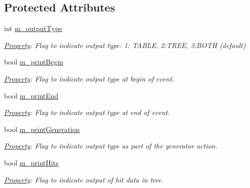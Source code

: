 \subsection*{Protected Attributes}
\begin{DoxyCompactItemize}
\item 
int \hyperlink{class_d_d4hep_1_1_simulation_1_1_geant4_particle_print_a0dc2b81ac74da2e496892d9cccf30f56}{m\+\_\+output\+Type}
\begin{DoxyCompactList}\small\item\em \hyperlink{class_d_d4hep_1_1_property}{Property}\+: Flag to indicate output type\+: 1\+: T\+A\+B\+LE, 2\+:T\+R\+EE, 3\+:B\+O\+TH (default) \end{DoxyCompactList}\item 
bool \hyperlink{class_d_d4hep_1_1_simulation_1_1_geant4_particle_print_a876b6bca1f7dc285d064785ddf9838a2}{m\+\_\+print\+Begin}
\begin{DoxyCompactList}\small\item\em \hyperlink{class_d_d4hep_1_1_property}{Property}\+: Flag to indicate output type at begin of event. \end{DoxyCompactList}\item 
bool \hyperlink{class_d_d4hep_1_1_simulation_1_1_geant4_particle_print_a1c439ecc16654cace16881a0c6a1414c}{m\+\_\+print\+End}
\begin{DoxyCompactList}\small\item\em \hyperlink{class_d_d4hep_1_1_property}{Property}\+: Flag to indicate output type at end of event. \end{DoxyCompactList}\item 
bool \hyperlink{class_d_d4hep_1_1_simulation_1_1_geant4_particle_print_aa9e8a756d0ffc2d753d32941780d8f99}{m\+\_\+print\+Generation}
\begin{DoxyCompactList}\small\item\em \hyperlink{class_d_d4hep_1_1_property}{Property}\+: Flag to indicate output type as part of the generator action. \end{DoxyCompactList}\item 
bool \hyperlink{class_d_d4hep_1_1_simulation_1_1_geant4_particle_print_ab411968553cdfbc30a79a385c0fa25c4}{m\+\_\+print\+Hits}
\begin{DoxyCompactList}\small\item\em \hyperlink{class_d_d4hep_1_1_property}{Property}\+: Flag to indicate output of hit data in tree. \end{DoxyCompactList}\end{DoxyCompactItemize}


